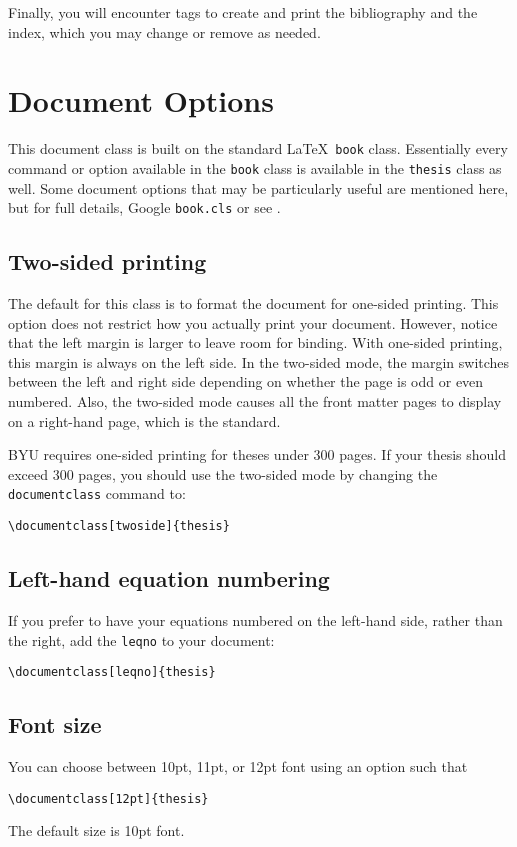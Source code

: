 \documentclass[12pt]{thesis}
\begin{document}
Finally, you will encounter tags to create and print the bibliography and the index, which you may change or remove as needed.

\chapter{Document Options}
This document class is built on the standard \LaTeX\ \texttt{book} class. Essentially every command or option available in the \texttt{book} class is available in the \texttt{thesis} class as well. Some document options that may be particularly useful are mentioned here, but for full details, Google \texttt{book.cls} or see \cite{lamport, goossens, computation-page}.

\section{Two-sided printing}
The default for this class is to format the document for one-sided printing. This option does not restrict how you actually print your document. However, notice that the left margin is larger to leave room for binding. With one-sided printing, this margin is always on the left side. In the two-sided mode, the margin switches between the left and right side depending on whether the page is odd or even numbered. Also, the two-sided mode causes all the front matter pages to display on a right-hand page, which is the standard.

BYU requires one-sided printing for theses under 300 pages. If your thesis should exceed 300 pages, you should use the two-sided mode by changing the \texttt{documentclass} command to:
\begin{verbatim}
\documentclass[twoside]{thesis}
\end{verbatim}

\section{Left-hand equation numbering}
If you prefer to have your equations numbered on the left-hand side, rather than the right, add the \texttt{leqno} to your document:
\begin{verbatim}
\documentclass[leqno]{thesis}
\end{verbatim}

\section{Font size}
You can choose between 10pt, 11pt, or 12pt font using an option such that
\begin{verbatim}
\documentclass[12pt]{thesis}
\end{verbatim}
The default size is 10pt font.
\end{document}
